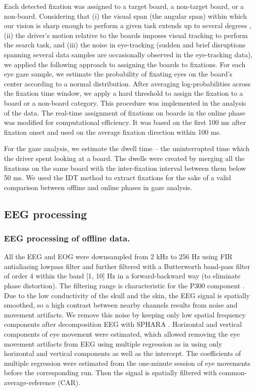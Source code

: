 \documentclass[12pt]{iopart}
\begin{document}
Each detected fixation was assigned to a target board, a non-target board, or a non-board.
Considering that (i) the visual span (the angular span) within which our vision is sharp enough to perform a given task extends up to several degrees \cite{legge_psychophysics_2001}, (ii) the driver's motion relative to the boards imposes visual tracking to perform the search task, and (iii) the noise in eye-tracking (sudden and brief disruptions spanning several data samples are occasionally observed in the eye-tracking data), we applied the following approach to assigning the boards to fixations. 
For each eye gaze sample, we estimate the probability of
fixating eyes on the board's center according to a normal distribution.
After averaging log-probabilities across the fixation time window, we apply a hard
threshold to assign the fixation to a board or a non-board category.
This procedure was implemented in the analysis of the data.
The real-time assignment of fixations on boards in the online phase was
modified for computational efficiency. It was based
on the first 100 ms after fixation onset and
used on the average fixation direction within 100 ms.

For the gaze analysis, we estimate 
the dwell time -- the uninterrupted time which the driver spent looking at a board.
The dwells were created
by merging all the fixations on the same board with the inter-fixation interval 
between them below 50 ms.
We used the IDT method to extract fixations for the sake of a valid comparison
between offline and online phases in gaze analysis.



\subsection{EEG processing}
\subsubsection*{EEG processing of offline data.}
All the EEG and EOG were downsampled from 2 kHz to 256 Hz
using FIR antialiasing lowpass filter
and further filtered  with a Butterworth band-pass filter
of order 4 within the band [1, 10] Hz  in a forward-backward way (to eliminate phase distortion).
The filtering range is characteristic for the P300 component \cite{demiralp_wavelet_2001}.
Due to the low conductivity of the skull and the skin,
the EEG signal is spatially smoothed, so a high contrast between nearby channels
results from noise and movement artifacts. We remove this noise
by keeping only low spatial frequency components after decomposition EEG with SPHARA \cite{graichen_sphara_2015}.
Horizontal and vertical components of eye movement were estimated, which allowed
removing the eye movement artifacts from EEG using multiple regression 
as in \cite{schlogl_fully_2007} using only horizontal and vertical 
components as well as the intercept.
The coefficients of multiple regression were estimated from the 
one-minute session of eye movements before the corresponding run.
Then the signal is spatially
filtered with common-average-reference (CAR). 
\end{document}
